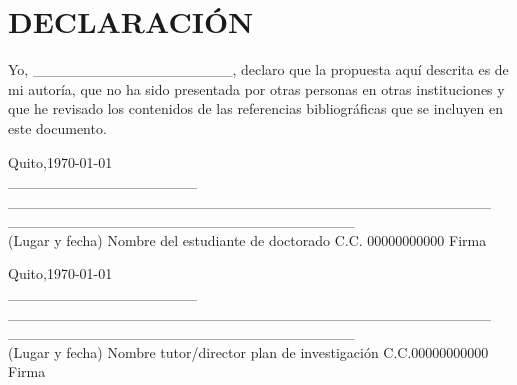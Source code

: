 \documentclass[a4paper,12pt]{article}
\begin{document}
	\section*{DECLARACIÓN}
	
	Yo, \_\_\_\_\_\_\_\_\_\_\_\_\_\_\_\_\_\_\_, declaro que la propuesta aquí descrita es de mi autoría, que no ha sido presentada por otras personas en otras instituciones y que he revisado los contenidos de las referencias bibliográficas que se incluyen en este documento.
	
	\vspace{1cm}
	
	\begin{flushleft}
			Quito,\today\\
		\_\_\_\_\_\_\_\_\_\_\_\_\_\_\_\_\_\_\hspace{0.1cm} \_\_\_\_\_\_\_\_\_\_\_\_\_\_\_\_\_\_\_\_\_\_\_\_\_\_\_\_\_\_\_\_\_\_\_\_\_\_\_\_\_\_\_\_\_\_  \hspace{0.3cm}\_\_\_\_\_\_\_\_\_\_\_\_\_\_\_\_\_\hspace{0.1cm}\_\_\_\_\_\_\_\_\_\_\_\_\_\_\_\_\\
		(Lugar y fecha) \hspace{0.2cm} Nombre del estudiante de doctorado \hspace{0.2cm} C.C.\hspace{0.05cm} 00000000000 \hspace{0.1cm} Firma \\
	\end{flushleft}
	
	\vspace{1cm}
	
	\begin{flushleft}
		Quito,\today\\
	\_\_\_\_\_\_\_\_\_\_\_\_\_\_\_\_\_\_\hspace{0.1cm} \_\_\_\_\_\_\_\_\_\_\_\_\_\_\_\_\_\_\_\_\_\_\_\_\_\_\_\_\_\_\_\_\_\_\_\_\_\_\_\_\_\_\_\_\_\_  \hspace{0.3cm}\_\_\_\_\_\_\_\_\_\_\_\_\_\_\_\_\_\hspace{0.1cm}\_\_\_\_\_\_\_\_\_\_\_\_\_\_\_\_\\
		(Lugar y fecha) \hspace{0.0cm} Nombre tutor/director plan de investigación \hspace{0.1cm} C.C.\hspace{0.05cm}00000000000 \hspace{0.1cm} Firma \\
	\end{flushleft}
	
\end{document}
